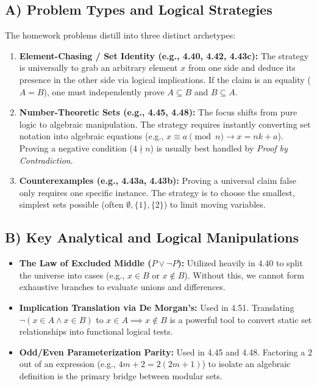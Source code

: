 \documentclass[11pt]{article}
\begin{document}
\subsection{A) Problem Types and Logical Strategies}
The homework problems distill into three distinct archetypes:
\begin{enumerate}
    \item \textbf{Element-Chasing / Set Identity (e.g., 4.40, 4.42, 4.43c):} The strategy is universally to grab an arbitrary element $x$ from one side and deduce its presence in the other side via logical implications. If the claim is an equality ($A = B$), one must independently prove $A \subseteq B$ and $B \subseteq A$. 
    \item \textbf{Number-Theoretic Sets (e.g., 4.45, 4.48):} The focus shifts from pure logic to algebraic manipulation. The strategy requires instantly converting set notation into algebraic equations (e.g., $x \equiv a \pmod n \to x = nk + a$). Proving a negative condition ($4 \nmid n$) is usually best handled by \textit{Proof by Contradiction}.
    \item \textbf{Counterexamples (e.g., 4.43a, 4.43b):} Proving a universal claim false only requires one specific instance. The strategy is to choose the smallest, simplest sets possible (often $\emptyset, \{1\}, \{2\}$) to limit moving variables.
\end{enumerate}

\subsection{B) Key Analytical and Logical Manipulations}
\begin{itemize}
    \item \textbf{The Law of Excluded Middle ($P \lor \neg P$):} Utilized heavily in 4.40 to split the universe into cases (e.g., $x \in B$ or $x \notin B$). Without this, we cannot form exhaustive branches to evaluate unions and differences.
    \item \textbf{Implication Translation via De Morgan's:} Used in 4.51. Translating $\neg(x \in A \land x \in B)$ to $x \in A \implies x \notin B$ is a powerful tool to convert static set relationships into functional logical tests.
    \item \textbf{Odd/Even Parameterization Parity:} Used in 4.45 and 4.48. Factoring a $2$ out of an expression (e.g., $4m + 2 = 2(2m + 1)$) to isolate an algebraic definition is the primary bridge between modular sets.
\end{itemize}
\end{document}
